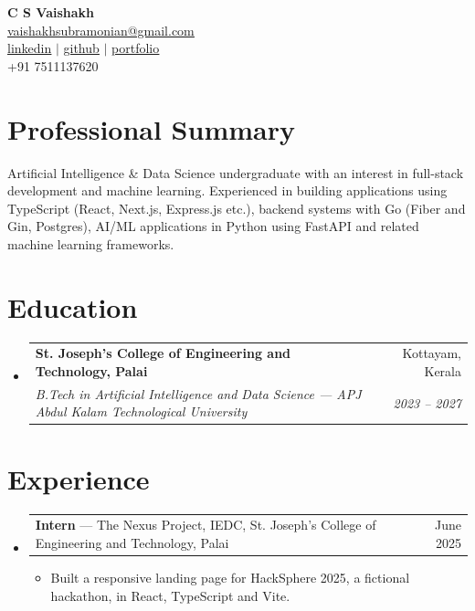 \documentclass[letterpaper,11pt]{article}
\makeatletter
\newcommand{\bodyfont}{\fontsize{10.5pt}{13pt}\selectfont}
\newcommand{\itemgap}{0pt}      %
\newcommand{\blockgap}{-5pt}    %
\newcommand{\listgap}{-1pt}     %
\newcommand{\resumeItem}[1]{%
  \item{\bodyfont #1\par}\vspace{\itemgap}%
}
\newcommand{\resumeSubheading}[4]{
  \vspace{-2pt}\item
    \begin{tabular*}{0.97\textwidth}[t]{l@{\extracolsep{\fill}}r}
      \textbf{#1} & #2 \\
      \textit{\small#3} & \textit{\small #4} \\
    \end{tabular*}\vspace{\blockgap}
}
\newcommand{\resumeProjectHeading}[2]{
    \item
    \begin{tabular*}{0.97\textwidth}{l@{\extracolsep{\fill}}r}
      \small#1 & #2 \\
    \end{tabular*}\vspace{\blockgap}
}
\newcommand{\resumeSubHeadingListStart}{\begin{itemize}[leftmargin=0.15in, label={}]}
\newcommand{\resumeSubHeadingListEnd}{\end{itemize}}
\newcommand{\resumeItemListStart}{\begin{itemize}[itemsep=1pt, parsep=0pt, topsep=2pt]}
\newcommand{\resumeItemListEnd}{\end{itemize}\vspace{\listgap}}
\makeatother
\begin{document}

\begin{center}
    \textbf{\Huge C S Vaishakh} \\ \vspace{1pt}
    \small \href{mailto:vaishakhsubramonian@gmail.com}{\underline{vaishakhsubramonian@gmail.com}} \\ \vspace{1pt}
    \small \href{https://linkedin.com/in/csvaishakh}{\underline{linkedin}} $|$
    \href{https://github.com/CSVaishakh}{\underline{github}} $|$
    \href{https://vaishakh.vercel.app/}{\underline{portfolio}} \\ \vspace{1pt}
    \small +91 7511137620
\end{center}

\section*{Professional Summary}
Artificial Intelligence \& Data Science undergraduate with an interest in full-stack development and machine learning. Experienced in building applications using TypeScript (React, Next.js, Express.js etc.), backend systems with Go (Fiber and Gin, Postgres), AI/ML applications in Python using FastAPI and related machine learning frameworks.

\section{Education}
\resumeSubHeadingListStart
  \resumeSubheading
    {St. Joseph's College of Engineering and Technology, Palai}{Kottayam, Kerala}
    {B.Tech in Artificial Intelligence and Data Science --- APJ Abdul Kalam Technological University}{2023 -- 2027}
\resumeSubHeadingListEnd

\section{Experience}
\resumeSubHeadingListStart
  \resumeProjectHeading
      {\textbf{Intern} --- The Nexus Project, IEDC, St. Joseph's College of Engineering and Technology, Palai}{June 2025}
    \resumeItemListStart
      \resumeItem{Built a responsive landing page for HackSphere 2025, a fictional hackathon, in React, TypeScript and Vite.}
    \resumeItemListEnd
\resumeSubHeadingListEnd
\end{document}
